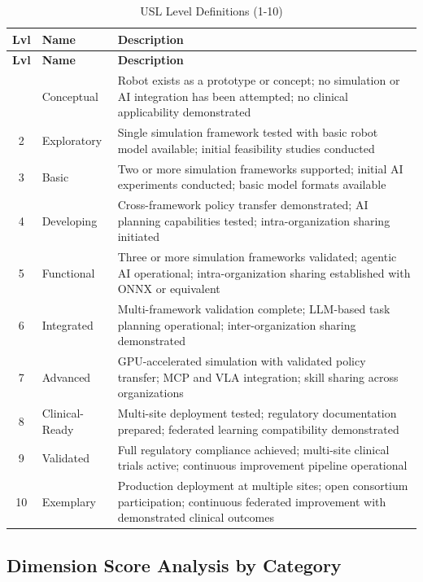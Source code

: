 \begin{longtable}{c l p{10cm}}
\caption{USL Level Definitions (1-10)}
\label{tab:usl-levels} \\
\toprule
\textbf{Lvl} & \textbf{Name} & \textbf{Description} \\
\midrule
\endfirsthead
\toprule
\textbf{Lvl} & \textbf{Name} & \textbf{Description} \\
\midrule
\endhead
\bottomrule
\endfoot
1 & Conceptual & Robot exists as a prototype or concept; no simulation or AI integration has been attempted; no clinical applicability demonstrated \\
2 & Exploratory & Single simulation framework tested with basic robot model available; initial feasibility studies conducted \\
3 & Basic & Two or more simulation frameworks supported; initial AI experiments conducted; basic model formats available \\
4 & Developing & Cross-framework policy transfer demonstrated; AI planning capabilities tested; intra-organization sharing initiated \\
5 & Functional & Three or more simulation frameworks validated; agentic AI operational; intra-organization sharing established with ONNX or equivalent \\
6 & Integrated & Multi-framework validation complete; LLM-based task planning operational; inter-organization sharing demonstrated \\
7 & Advanced & GPU-accelerated simulation with validated policy transfer; MCP and VLA integration; skill sharing across organizations \\
8 & Clinical-Ready & Multi-site deployment tested; regulatory documentation prepared; federated learning compatibility demonstrated \\
9 & Validated & Full regulatory compliance achieved; multi-site clinical trials active; continuous improvement pipeline operational \\
10 & Exemplary & Production deployment at multiple sites; open consortium participation; continuous federated improvement with demonstrated clinical outcomes \\
\end{longtable}

\subsection{Dimension Score Analysis by Category}
\label{subsec:dimension-analysis}

